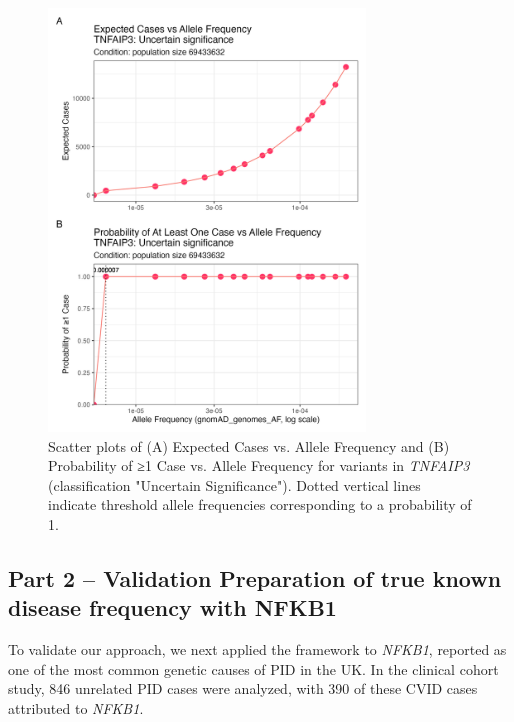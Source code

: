 \documentclass[a4paper,12pt]{article}
\begin{document}
\begin{figure}[H]
  \centering
  \includegraphics[width=0.75\textwidth]{../images/tnfaip3_scatter_expected_prob.png}
  \caption{Scatter plots of (A) Expected Cases vs. Allele Frequency and (B) Probability of ≥1 Case vs. Allele Frequency for variants in \textit{TNFAIP3} (classification "Uncertain Significance"). Dotted vertical lines indicate threshold allele frequencies corresponding to a probability of 1.}
  \label{fig:tnfaip3_scatter_expected_prob}
\end{figure}

\subsection{Part 2 -- Validation Preparation of true known disease frequency with NFKB1}
To validate our approach, we next applied the framework to \textit{NFKB1}, reported as one of the most common genetic causes of PID in the UK. In the clinical cohort study, 846 unrelated PID cases were analyzed, with 390 of these CVID cases attributed to \textit{NFKB1}. 
\end{document}
